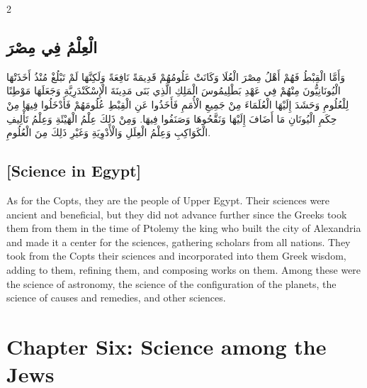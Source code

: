 \documentclass[11pt,a4paper]{article}
\newcommand{\ar}[1]{{\arabicfont\beginR #1\endR}}
\begin{document}
\begin{paracol}{2}
\sloppy

\begin{leftcolumn}
\subsection*{\ar{الْعِلْمُ فِي مِصْرَ}}
\vspace{0.3cm}
{\arabicfont\beginR
وَأَمَّا الْقِبْطُ فَهُمْ أَهْلُ مِصْرَ الْعُلَا وَكَانَتْ عَلُومُهُمْ قَدِيمَةً نَافِعَةً وَلَكِنَّهَا لَمْ تَبْلُغْ مُنْذُ أَخَذَتْهَا الْيُونَانِيُّونَ مِنْهُمْ فِي عَهْدِ بَطْلِيمُوسَ الْمَلِكِ الَّذِي بَنَى مَدِينَةَ الْإِسْكَنْدَرِيَّةِ وَجَعَلَهَا مَوْطِنًا لِلْعُلُومِ وَحَشَدَ إِلَيْهَا الْعُلَمَاءَ مِنْ جَمِيعِ الْأُمَمِ فَأَخَذُوا عَنِ الْقِبْطِ عُلُومَهُمْ فَأَدْخَلُوا فِيهَا مِنْ حِكَمِ الْيُونَانِ مَا أَضَافَ إِلَيْهَا وَنَقَّحُوهَا وَصَنَفُوا فِيهَا. وَمِنْ ذَلِكَ عِلْمُ الْهَيْئَةِ وَعِلْمُ تَأْلِيفِ الْكَوَاكِبِ وَعِلْمُ الْعِلَلِ وَالْأَدْوِيَةِ وَغَيْرِ ذَلِكَ مِنَ الْعُلُومِ.
\endR}
\end{leftcolumn}

\begin{rightcolumn}
\subsection*{[Science in Egypt]}
\vspace{0.3cm}
As for the Copts, they are the people of Upper Egypt. Their sciences were ancient and beneficial, but they did not advance further since the Greeks took them from them in the time of Ptolemy the king who built the city of Alexandria and made it a center for the sciences, gathering scholars from all nations. They took from the Copts their sciences and incorporated into them Greek wisdom, adding to them, refining them, and composing works on them. Among these were the science of astronomy, the science of the configuration of the planets, the science of causes and remedies, and other sciences.
\end{rightcolumn}

\end{paracol}

\clearpage

\section*{Chapter Six: Science among the Jews}
\end{document}
